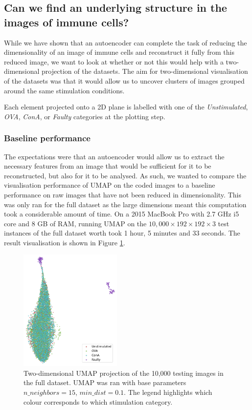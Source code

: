 \subsection{Can we find an underlying structure in the images of immune cells?}

While we have shown that an autoencoder can complete the task of reducing the dimensionality of an image of immune cells and reconstruct it fully from this reduced image, we want to look at whether or not this would help with a two-dimensional projection of the datasets. The aim for two-dimensional visualisation of the datasets was that it would allow us to uncover clusters of images grouped around the same stimulation conditions.

Each element projected onto a 2D plane is labelled with one of the \textit{Unstimulated}, \textit{OVA}, \textit{ConA}, or \textit{Faulty} categories at the plotting step.

\bigskip
\subsubsection{Baseline performance}
\hfill
\hfill 

The expectations were that an autoencoder would allow us to extract the necessary features from an image that would be sufficient for it to be reconstructed, but also for it to be analysed. As such, we wanted to compare the visualisation performance of UMAP on the coded images to a baseline performance on raw images that have not been reduced in dimensionality. This was only ran for the full dataset as the large dimensions meant this computation took a considerable amount of time. On a 2015 MacBook Pro with 2.7 GHz i5 core and 8 GB of RAM, running UMAP on the $10,000\times192\times192\times3$ test instances of the full dataset worth took 1 hour, 5 minutes and 33 seconds. The result visualisation is shown in Figure \ref{fig:baseline_vis}.


\begin{figure}[h!]
    \centering
    \includegraphics[width=0.45\textwidth]{dissertation/figures/evaluation/CK19_baseline_visualisation.png}
    \caption{Two-dimensional UMAP projection of the 10,000 testing images in the full dataset. UMAP was ran with base parameters $n\_neighbors=15$, $min\_dist=0.1$. The legend highlights which colour corresponds to which stimulation category.}
    \label{fig:baseline_vis}
\end{figure}


